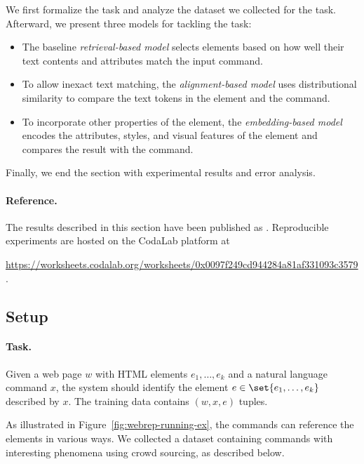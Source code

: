 We first formalize the task and analyze the dataset
we collected for the task.
Afterward, we present three models for tackling the task:
\begin{itemize}
\item
The baseline \emph{retrieval-based model}
selects elements based on how well their text contents
and attributes match the input command.
\item
To allow inexact text matching,
the \emph{alignment-based model}
uses distributional similarity to compare the text tokens
in the element and the command.
\item
To incorporate other properties of the element,
the \emph{embedding-based model} encodes the attributes,
styles, and visual features of the element
and compares the result with the command.
\end{itemize}
Finally, we end the section with experimental results
and error analysis.

\paragraph{Reference.}
The results described in this section have been published as
\citet{pasupat2018elements}.
Reproducible experiments are hosted on the
CodaLab platform at
\begin{center}
\small
\url{https://worksheets.codalab.org/worksheets/0x0097f249cd944284a81af331093c3579}.
\end{center}

\subsection{Setup}

\paragraph{Task.}
Given a web page $w$ with HTML elements
$e_1, \dots, e_k$
and a natural language command $x$,
the system should
identify the element $e \in \set{e_1, \dots, e_k}$
described by $x$.
The training data contains $(w, x, e)$ tuples.

As illustrated in Figure~\ref{fig:webrep-running-ex},
the commands can reference the elements in various ways.
We collected a dataset containing commands with
interesting phenomena
using crowd sourcing, as described below.

